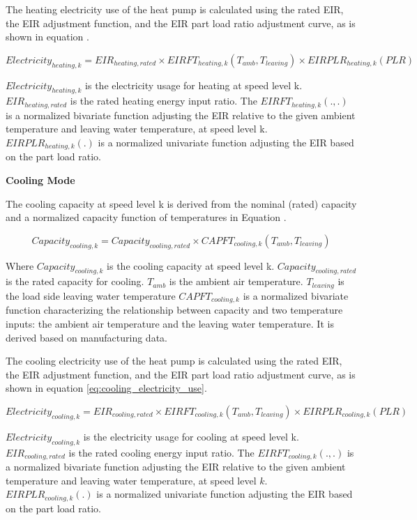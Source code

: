 The heating electricity use of the heat pump is calculated using the rated EIR,
the EIR adjustment function, and the EIR part load ratio adjustment curve, as is
shown in equation .

\begin{equation}\label{eq:heating_electricity_use}
Electricity_{heating,k}=EIR_{heating,rated} \times EIRFT_{heating,k}(T_{amb}, T_{leaving}) \times EIRPLR_{heating,k}(PLR)
\end{equation}

$Electricity_{heating,k}$ is the electricity usage for heating at speed level k.
$EIR_{heating,rated}$ is the rated heating energy input ratio. The
$EIRFT_{heating,k}(., .)$ is a normalized bivariate function adjusting the EIR
relative to the given ambient temperature and leaving water temperature, at
speed level k. $EIRPLR_{heating,k}(.)$ is a normalized univariate function
adjusting the EIR based on the part load ratio.

\noindent\textbf{Cooling Mode}

The cooling capacity at speed level k is derived from the nominal (rated)
capacity and a normalized capacity function of temperatures in Equation .

\begin{equation}
Capacity_{cooling,k}=Capacity_{cooling,rated} \times CAPFT_{cooling,k}(T_{amb},T_{leaving})
\end{equation}

Where $Capacity_{cooling,k}$ is the cooling capacity at speed level k.
$Capacity_{cooling,rated}$ is the rated capacity for cooling. $T_{amb}$ is the ambient air
temperature. $T_{leaving}$ is the load side leaving water temperature $CAPFT_{cooling,k}$
is a normalized bivariate function characterizing the relationship between
capacity and two temperature inputs: the ambient air temperature and the leaving
water temperature. It is derived based on manufacturing data.

The cooling electricity use of the heat pump is calculated using the rated EIR,
the EIR adjustment function, and the EIR part load ratio adjustment curve, as is
shown in equation \ref{eq:cooling_electricity_use}.

\begin{equation}\label{eq:cooling_electricity_use}
Electricity_{cooling,k}=EIR_{cooling,rated} \times EIRFT_{cooling,k}(T_{amb}, T_{leaving}) \times EIRPLR_{cooling,k}(PLR)
\end{equation}

$Electricity_{cooling,k}$ is the electricity usage for cooling at speed level k.
$EIR_{cooling,rated}$ is the rated cooling energy input ratio. The $EIRFT_{cooling,k}(., .)$ is a
normalized bivariate function adjusting the EIR relative to the given ambient temperature
and leaving water temperature, at speed level $k$.
$EIRPLR_{cooling,k}(.)$ is a normalized univariate function adjusting the EIR based
on the part load ratio.

